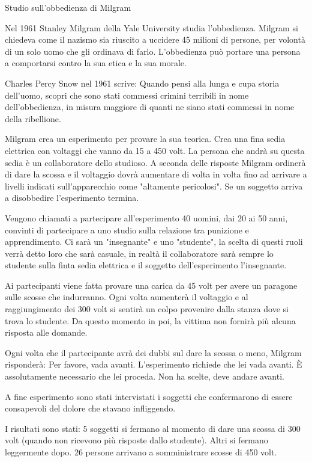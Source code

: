 \documentclass[12pt]{book} %
\begin{document}
\begin{mdframed}[linewidth=1pt]
Studio sull'obbedienza di Milgram

Nel 1961 Stanley Milgram della Yale University studia l'obbedienza. Milgram si chiedeva come il
nazismo sia riuscito a uccidere 45 milioni di persone, per volontà di un solo uomo che gli ordinava di farlo.
L'obbedienza può portare una persona a comportarsi contro la sua etica e la sua morale.

Charles Percy Snow nel 1961 scrive: Quando pensi alla lunga e cupa storia dell'uomo, scopri che
sono stati commessi crimini terribili in nome dell'obbedienza, in misura maggiore di quanti ne
siano stati commessi in nome della ribellione.

Milgram crea un esperimento per provare la sua teorica. Crea una fina sedia elettrica con voltaggi che vanno da 15 a 450
volt. La persona che andrà su questa sedia è un collaboratore dello studioso. A seconda delle risposte Milgram ordinerà
di dare la scossa e il voltaggio dovrà aumentare di volta in volta fino ad arrivare a livelli indicati sull'apparecchio
come "altamente pericolosi". Se un soggetto arriva a disobbedire l'esperimento termina.

Vengono chiamati a partecipare all'esperimento 40 uomini, dai 20 ai 50 anni, convinti di partecipare a uno studio sulla
relazione tra punizione e apprendimento. Ci sarà un "insegnante" e uno
"studente", la scelta di questi ruoli verrà detto loro che sarà casuale, in realtà il
collaboratore sarà sempre lo studente sulla finta sedia elettrica e il soggetto dell'esperimento l'insegnante.

Ai partecipanti viene fatta provare una carica da 45 volt per avere un paragone sulle scosse che indurranno. Ogni volta
aumenterà il voltaggio e al raggiungimento dei 300 volt si sentirà un colpo provenire dalla stanza dove si trova lo
studente. Da questo momento in poi, la vittima non fornirà più alcuna risposta alle domande.

Ogni volta che il partecipante avrà dei dubbi sul dare la scossa o meno, Milgram risponderà: Per favore, vada avanti.
L'esperimento richiede che lei vada avanti. È assolutamente necessario che lei proceda. Non ha
scelte, deve andare avanti.

A fine esperimento sono stati intervistati i soggetti che confermarono di essere consapevoli del dolore che stavano
infliggendo. 

I risultati sono stati: 5 soggetti si fermano al momento di dare una scossa di 300 volt (quando non ricevono più
risposte dallo studente). Altri si fermano leggermente dopo. 26 persone arrivano a somministrare scosse di 450 volt.


\end{mdframed}
\end{document}
